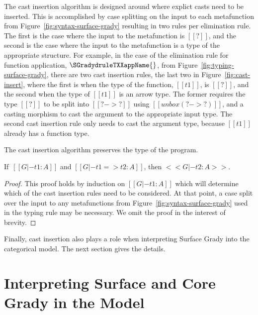 The cast insertion algorithm is designed around where explict casts
need to be inserted.  This is accomplished by case splitting on the
input to each metafunction from Figure~\ref{fig:syntax-surface-grady}
resulting in two rules per elimination rule.  The first is the case
where the input to the metafunction is $[[?]]$, and the second is the
case where the input to the metafunction is a type of the appropriate
structure.  For example, in the case of the elimination rule for
function application, $\SGradydruleTXXappName{}$, from
Figure~\ref{fig:typing-surface-grady}, there are two cast insertion
rules, the last two in Figure~\ref{fig:cast-insert}, where the first
is when the type of the function, $[[t1]]$, is $[[?]]$, and the second
when the type of $[[t1]]$ is an arrow type.  The former requires the
type $[[?]]$ to be split into $[[? -> ?]]$ using $[[unbox (? -> ?)]]$,
and a casting morphism to cast the argument to the appropriate input
type.  The second cast insertion rule only needs to cast the argument
type, because $[[t1]]$ already has a function type.

The cast insertion algorithm preserves the type of the program.
\begin{lemma}
  \label{lemma:cast_insertion_preserves_the_type}
  If $\,[[G |- t1 : A]]$ and $[[G |- t1 => t2 : A]]$, then $<<G |- t2 : A>>$.
\end{lemma}
\begin{proof}
  This proof holds by induction on $[[G |- t1 : A]]$ which will
  determine which of the cast insertion rules need to be considered.
  At that point, a case split over the input to any metafunctions from
  Figure~\ref{fig:syntax-surface-grady} used in the typing rule may be
  necessary.  We omit the proof in the interest of brevity.
\end{proof}
\noindent
Finally, cast insertion also plays a role when interpreting Surface
Grady into the categorical model.  The next section gives the details.


\section{Interpreting Surface and Core Grady in the Model}
\label{sec:interpreting_surface_grady_in_the_model}

